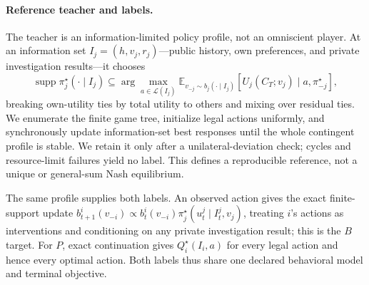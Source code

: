 \paragraph{Reference teacher and labels.}
The teacher is an information-limited policy profile, not an omniscient player.
At an information set $I_j=(h,v_j,r_j)$---public history, own preferences, and
private investigation results---it chooses
\begin{equation}
 \operatorname{supp}\pi_j^{\star}(\cdot\mid I_j)\subseteq
 \arg\max_{a\in\mathcal L(I_j)}
 \mathbb E_{v_{-j}\sim b_j(\cdot\mid I_j)}
       [U_j(C_T;v_j)\mid a,\pi_{-j}^{\star}],
 \label{eq:teacher-policy}
\end{equation}
breaking own-utility ties by total utility to others and mixing over residual
ties.  We enumerate the finite game tree, initialize legal actions uniformly,
and synchronously update information-set best responses until the whole
contingent profile is stable.  We retain it only after a unilateral-deviation
check; cycles and resource-limit failures yield no label.  This defines a
reproducible reference, not a unique or general-sum Nash equilibrium.

The same profile supplies both labels.  An observed action gives the exact
finite-support update $b_{t+1}^i(v_{-i})\propto b_t^i(v_{-i})
\pi_j^{\star}(u_t^j\mid I_t^j,v_j)$, treating $i$'s actions as interventions
and conditioning on any private investigation result; this is the $B$ target.
For $P$, exact continuation gives $Q_i^{\star}(I_i,a)$ for every legal action
and hence every optimal action.  Both labels thus share one declared behavioral
model and terminal objective.
